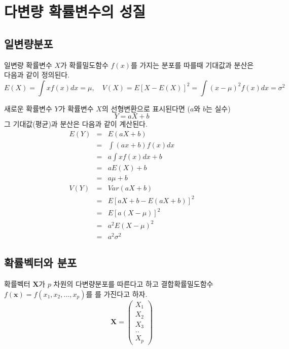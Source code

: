 \documentclass[
]{book}
\theoremstyle{definition}
\theoremstyle{definition}
\theoremstyle{definition}
\theoremstyle{remark}
\begin{document}
\hypertarget{mulivar}{%
\chapter{다변량 확률변수의 성질}\label{mulivar}}

\hypertarget{uxc77cuxbcc0uxb7c9uxbd84uxd3ec}{%
\section{일변량분포}\label{uxc77cuxbcc0uxb7c9uxbd84uxd3ec}}

일변량 확률변수 \(X\)가 확률밀도함수 \(f(x)\)를 가지는 분포를 따를때 기대값과 분산은 다음과 같이 정의된다.
\[ E(X) = \int x f(x)  dx = \mu, \quad V(X) = E[ X-E(X)]^2=\int (x-\mu)^2 f(x) dx =\sigma^2 \]

새로운 확률변수 \(Y\)가 확률변수 \(X\)의 선형변환으로 표시된다면 (\(a\)와 \(b\)는 실수)
\[ Y = aX+b\]
그 기대값(평균)과 분산은 다음과 같이 계산된다.
\begin{eqnarray*}
E(Y) &=& E(aX+b) \\
&=& \int (ax+b) f(x) dx \\
&=& a \int x f(x) dx + b \\
&=& a E(X) + b\\
&=& a \mu + b \\
V(Y) &=& Var(aX+b) \\
&=& E[aX+b -E(aX+b)]^2 \\
&=& E[a(X-\mu)]^2 \\
&=& a^2 E(X-\mu)^2\\
&=& a^2 \sigma^2
\end{eqnarray*}

\hypertarget{uxd655uxb960uxbca1uxd130uxc640-uxbd84uxd3ec}{%
\section{확률벡터와 분포}\label{uxd655uxb960uxbca1uxd130uxc640-uxbd84uxd3ec}}

확률벡터 \(\bm X\)가 \(p\) 차원의 다변량분포를 따른다고 하고 결합확률밀도함수 \(f(\bm x) =f(x_1,x_2,\dots,x_p)\)를
를 가진다고 하자.
\begin{equation*}
\bm X =
  \begin{pmatrix}
X_1 \\
X_2 \\
X_3 \\
..  \\
X_p
\end{pmatrix}
\end{equation*}
\end{document}
